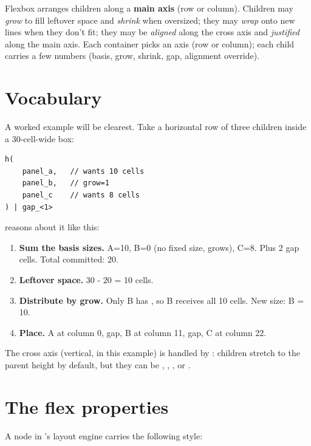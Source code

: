 Flexbox arranges children along a \textbf{main axis} (row or column).
Children may \emph{grow} to fill leftover space and \emph{shrink} when
oversized; they may \emph{wrap} onto new lines when they don't fit;
they may be \emph{aligned} along the cross axis and \emph{justified}
along the main axis. Each container picks an axis (row or column);
each child carries a few numbers (basis, grow, shrink, gap, alignment
override).

\section{Vocabulary}

A worked example will be clearest. Take a horizontal row of three
children inside a 30-cell-wide box:

\begin{lstlisting}
h(
    panel_a,   // wants 10 cells
    panel_b,   // grow=1
    panel_c    // wants 8 cells
) | gap_<1>
\end{lstlisting}

\maya{} reasons about it like this:

\begin{enumerate}[leftmargin=*]
  \item \textbf{Sum the basis sizes.} A=10, B=0 (no fixed size,
    grows), C=8. Plus 2 gap cells. Total committed: 20.
  \item \textbf{Leftover space.} 30 - 20 = 10 cells.
  \item \textbf{Distribute by grow.} Only B has , so
    B receives all 10 cells. New size: B = 10.
  \item \textbf{Place.} A at column 0, gap, B at column 11, gap, C
    at column 22.
\end{enumerate}

The cross axis (vertical, in this example) is handled by
: children stretch to the parent height by default, but
they can be , , , or
.

\section{The flex properties}

A node in \maya{}'s layout engine carries the following style:

